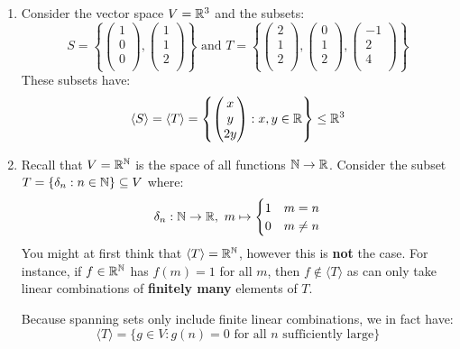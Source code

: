 \documentclass[../main.tex]{subfiles}
\begin{document}
\begin{example}
  \begin{enumerate} \label{linIndepEx}
    \item Consider the vector space $V = \mathbb{R}^3$ and the subsets:
      \[
        S = \left\{\begin{pmatrix}
        1 \\
        0 \\
        0 \\
        \end{pmatrix}, \begin{pmatrix}
        1 \\
        1 \\
        2 \\
        \end{pmatrix}\right\} \text{ and } T = \left\{
        \begin{pmatrix}
        2 \\
        1 \\
        2 \\
        \end{pmatrix}, \begin{pmatrix}
        0 \\
        1 \\
        2 \\
        \end{pmatrix}, \begin{pmatrix}
        -1 \\
        2 \\
        4 \\
        \end{pmatrix}\right\}
      \]
      These subsets have:
      \[
        \langle S \rangle = \langle T \rangle = \left\{\begin{pmatrix}
        x \\
        y \\
        2y \\
        \end{pmatrix}: x, y \in \mathbb{R}\right\} \leq \mathbb{R}^3
      \]
    \item Recall that $V = \mathbb{R}^{\mathbb{N}}$ is the space of all functions $\mathbb{N} \to \mathbb{R}$.
      Consider the subset $T = \{\delta_n: n \in \mathbb{N}\} \subseteq V$ where:
      \[
        \delta_n: \mathbb{N} \to \mathbb{R},\ m \mapsto \begin{cases}
        1 & m = n \\
        0 & m \neq n
        \end{cases}
      \]
      You might at first think that $\langle T \rangle = \mathbb{R}^{\mathbb{N}}$, however this is \textbf{not} the case.
      For instance, if $f \in \mathbb{R}^{\mathbb{N}}$ has $f(m) = 1$ for all $m$, then $f \notin \langle T \rangle$ as can only take linear combinations of \textbf{finitely many} elements of $T$.

      Because spanning sets only include finite linear combinations, we in fact have:
      \[
        \langle T \rangle = \{g \in V: g(n) = 0 \text{ for all $n$ sufficiently large}\}
      \]
  \end{enumerate}
\end{example}
\end{document}
